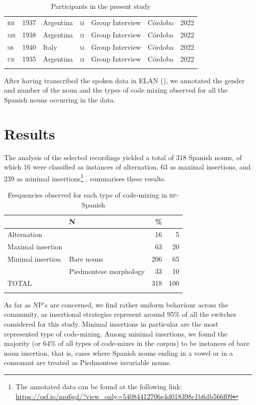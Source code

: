 \documentclass[output=paper]{langscibook}
\begin{document}
\begin{table}
\begin{tabularx}{\textwidth}{llllQQl}
\textsc{rr} & 1937 & {Argentina} & \textsc{m} & {Group Interview} & {Córdoba} & {2022}\\
\textsc{mb} & 1938 & {Argentina} & \textsc{m} & {Group Interview} & {Córdoba} & {2022}\\
\textsc{sb} & 1940 & Italy & \textsc{m} & {Group Interview} & {Córdoba} & {2022}\\
\textsc{ub} & 1935 & {Argentina} & \textsc{m} & {Group Interview} & {Córdoba} & {2022}\\
\lspbottomrule
\end{tabularx}
\caption{Participants in the present study}
\label{tab:goria:7}
\end{table}

After having transcribed the spoken data in ELAN (\citealt{WittenburgEtAl2006,SloetjesWittenburg2008}), we annotated the gender and number of the noun and the types of code mixing observed for all the Spanish nouns occurring in the data.

\section{Results}\label{sec:goria:6}

The analysis of the selected recordings yielded a total of 318 Spanish nouns, of which 16 were classified as instances of alternation, 63 as maximal insertions, and 239 as minimal insertions\footnote{The annotated data can be found at the following link: \url{https://osf.io/mu6gd/?view_only=54084412706e4d018398c1b6db566f09}} .  summarises these results.

\begin{table}
\begin{tabularx}{\textwidth}{XXrr}
\lsptoprule
\multicolumn{2}{c}{\textsc{cm} Type} & N & \%\\
\midrule
Alternation &  & 16 & 5\\
Maximal insertion &  & 63 & 20\\
Minimal insertion & Bare nouns & 206 & 65\\
 & Piedmontese morphology & 33 & 10\\
\midrule
TOTAL &  & 318 & 100\\
\lspbottomrule
\end{tabularx}
\caption{Frequencies observed for each type of code-mixing in \textsc{hp}-Spanish}
\label{tab:goria:8}
\end{table}

As far as NP's are concerned, we find rather uniform behaviour across the community, as insertional strategies represent around 95\% of all the switches considered for this study. Minimal insertions in particular are the most represented type of code-mixing. Among minimal insertions, we found the majority (or 64\% of all types of code-mixes in the corpus) to be instances of bare noun insertion, that is, cases where Spanish nouns ending in a vowel  or in a consonant  are treated as Piedmontese invariable nouns.
\end{document}
